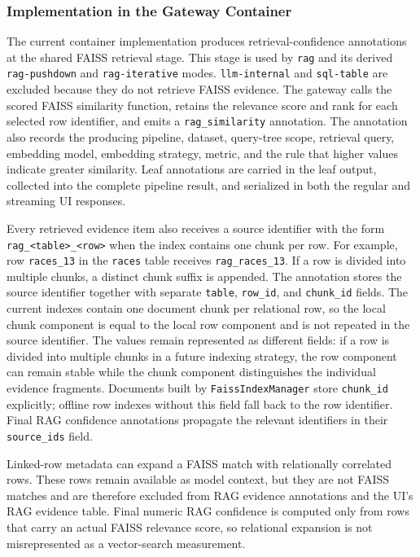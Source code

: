\documentclass[11pt,a4paper]{article}
\newcommand{\code}[1]{\texttt{#1}}
\begin{document}
\subsubsection{Implementation in the Gateway Container}

The current container implementation produces retrieval-confidence annotations
at the shared FAISS retrieval stage. This stage is used by \code{rag} and its
derived \code{rag-pushdown} and \code{rag-iterative} modes.
\code{llm-internal} and \code{sql-table} are excluded because they do not
retrieve FAISS evidence. The gateway calls the
scored FAISS similarity function, retains the relevance score and rank for each
selected row identifier, and emits a \code{rag\_similarity} annotation. The
annotation also records the producing pipeline, dataset, query-tree scope,
retrieval query, embedding model, embedding strategy, metric, and the rule that
higher values indicate greater similarity. Leaf annotations are carried in the
leaf output, collected into the complete pipeline result, and serialized in
both the regular and streaming UI responses.

Every retrieved evidence item also receives a source identifier with the form
\code{rag\_<table>\_<row>} when the index contains one chunk per row. For
example, row \code{races\_13} in the \code{races} table receives
\code{rag\_races\_13}. If a row is divided into multiple chunks, a distinct
chunk suffix is appended. The annotation
stores the source identifier together with separate \code{table},
\code{row\_id}, and \code{chunk\_id} fields. The current indexes contain one
document chunk per relational row, so the local chunk component is equal to the
local row component and is not repeated in the source identifier. The values
remain represented as different fields:
if a row is divided into multiple chunks in a future indexing strategy, the
row component can remain stable while the chunk component distinguishes the
individual evidence fragments. Documents built by \code{FaissIndexManager} store
\code{chunk\_id} explicitly; offline row indexes without this field fall back
to the row identifier. Final RAG confidence annotations propagate the relevant identifiers
in their \code{source\_ids} field.

Linked-row metadata can expand a FAISS match with relationally correlated rows.
These rows remain available as model context, but they are not FAISS matches
and are therefore excluded from RAG evidence annotations and the UI's RAG
evidence table. Final numeric RAG confidence is computed only from rows that
carry an actual FAISS relevance score, so relational expansion is not
misrepresented
as a vector-search measurement.
\end{document}
